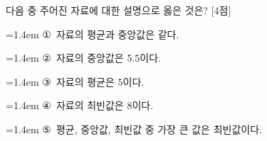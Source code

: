 다음 중 주어진 자료에 대한 설명으로 옳은 것은? \mbox{[4점]}
\par\medskip\par\noindent\hangindent=1.4em {\small ①}\ 자료의 평균과 중앙값은 같다.\par\noindent\hangindent=1.4em {\small ②}\ 자료의 중앙값은 $5.5$이다.\par\noindent\hangindent=1.4em {\small ③}\ 자료의 평균은 $5$이다.\par\noindent\hangindent=1.4em {\small ④}\ 자료의 최빈값은 $8$이다.\par\noindent\hangindent=1.4em {\small ⑤}\ 평균, 중앙값, 최빈값 중 가장 큰 값은 최빈값이다.\par\medskip
